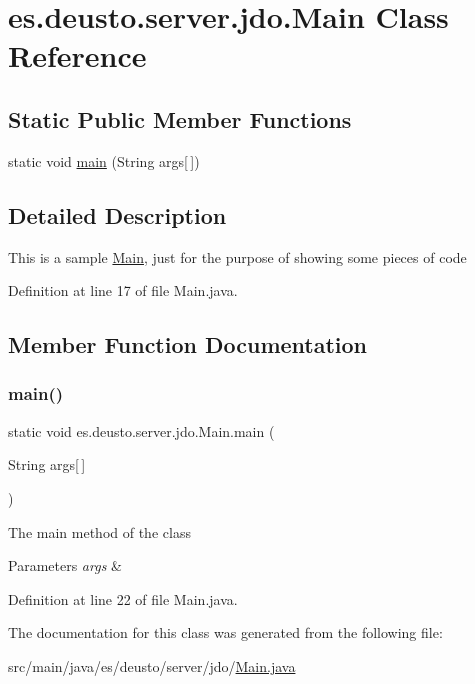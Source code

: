 \hypertarget{classes_1_1deusto_1_1server_1_1jdo_1_1_main}{}\section{es.\+deusto.\+server.\+jdo.\+Main Class Reference}
\label{classes_1_1deusto_1_1server_1_1jdo_1_1_main}
\subsection*{Static Public Member Functions}
\begin{DoxyCompactItemize}
\item 
static void \hyperlink{classes_1_1deusto_1_1server_1_1jdo_1_1_main_ae5c4387237170481808b08438af03fd9}{main} (String args\mbox{[}$\,$\mbox{]})
\end{DoxyCompactItemize}


\subsection{Detailed Description}
This is a sample \hyperlink{classes_1_1deusto_1_1server_1_1jdo_1_1_main}{Main}, just for the purpose of showing some pieces of code 

Definition at line 17 of file Main.\+java.



\subsection{Member Function Documentation}
\mbox{\label{classes_1_1deusto_1_1server_1_1jdo_1_1_main_ae5c4387237170481808b08438af03fd9}} 
\subsubsection{\texorpdfstring{main()}{main()}}
{\footnotesize\ttfamily static void es.\+deusto.\+server.\+jdo.\+Main.\+main (\begin{DoxyParamCaption}\item[{String}]{args\mbox{[}$\,$\mbox{]} }\end{DoxyParamCaption})\hspace{0.3cm}{\ttfamily [static]}}

The main method of the class 
\begin{DoxyParams}{Parameters}
{\em args} & \\
\hline
\end{DoxyParams}


Definition at line 22 of file Main.\+java.



The documentation for this class was generated from the following file\+:\begin{DoxyCompactItemize}
\item 
src/main/java/es/deusto/server/jdo/\hyperlink{_main_8java}{Main.\+java}\end{DoxyCompactItemize}
